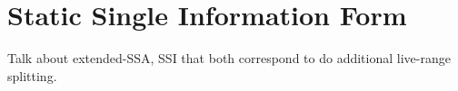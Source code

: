 \chapter{Static Single Information Form }
\label{chap:static_single_information}

Talk about extended-SSA, SSI that both correspond to do additional live-range splitting.

